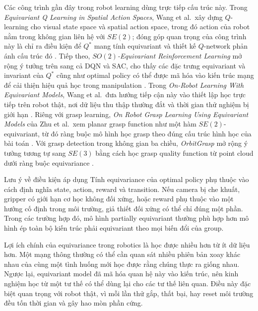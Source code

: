 Các công trình gần đây trong robot learning dùng trực tiếp cấu trúc này. Trong \textit{Equivariant Q Learning in Spatial Action Spaces}, Wang et al.\ xây dựng $Q$-learning cho visual state space và spatial action space, trong đó action của robot nằm trong không gian liên hệ với $SE(2)$; đóng góp quan trọng của công trình này là chỉ ra điều kiện để $Q^*$ mang tính equivariant và thiết kế $Q$-network phản ánh cấu trúc đó \cite{wang2021equivariant}. Tiếp theo, \textit{$SO(2)$-Equivariant Reinforcement Learning} mở rộng ý tưởng trên sang cả DQN và SAC, cho thấy các đặc trưng equivariant và invariant của $Q^*$ cũng như optimal policy có thể được mã hóa vào kiến trúc mạng để cải thiện hiệu quả học trong manipulation \cite{wang2022so2}. Trong \textit{On-Robot Learning With Equivariant Models}, Wang et al.\ đưa hướng tiếp cận này vào thiết lập học trực tiếp trên robot thật, nơi dữ liệu thu thập thường đắt và thời gian thử nghiệm bị giới hạn \cite{wang2022onrobot}. Riêng với grasp learning, \textit{On Robot Grasp Learning Using Equivariant Models} của Zhu et al.\ xem planar grasp function như một hàm $SE(2)$-equivariant, từ đó ràng buộc mô hình học grasp theo đúng cấu trúc hình học của bài toán \cite{zhu2023robot}. Với grasp detection trong không gian ba chiều, \textit{OrbitGrasp} mở rộng ý tưởng tương tự sang $SE(3)$ bằng cách học grasp quality function từ point cloud dưới ràng buộc equivariance \cite{hu2024orbitgrasp}.

\begin{warningbox}{Lưu ý về điều kiện áp dụng}
Tính equivariance của optimal policy phụ thuộc vào cách định nghĩa state, action, reward và transition. Nếu camera bị che khuất, gripper có giới hạn cơ học không đối xứng, hoặc reward phụ thuộc vào một hướng cố định trong môi trường, giả thiết đối xứng có thể chỉ đúng một phần. Trong các trường hợp đó, mô hình partially equivariant thường phù hợp hơn mô hình ép toàn bộ kiến trúc phải equivariant theo mọi biến đổi của group.
\end{warningbox}

Lợi ích chính của equivariance trong robotics là học được nhiều hơn từ ít dữ liệu hơn. Một mạng thông thường có thể cần quan sát nhiều phiên bản xoay khác nhau của cùng một tình huống mới học được rằng chúng thực ra giống nhau. Ngược lại, equivariant model đã mã hóa quan hệ này vào kiến trúc, nên kinh nghiệm học từ một tư thế có thể dùng lại cho các tư thế liên quan. Điều này đặc biệt quan trọng với robot thật, vì mỗi lần thử gắp, thất bại, hay reset môi trường đều tốn thời gian và gây hao mòn phần cứng.

